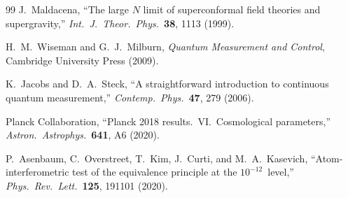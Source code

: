 \documentclass[12pt,letterpaper]{article}
\theoremstyle{definition}
\theoremstyle{remark}
\begin{document}
\begin{thebibliography}{99}
J.~Maldacena,
``The large $N$ limit of superconformal field theories and supergravity,''
\textit{Int.\ J.\ Theor.\ Phys.}\ \textbf{38}, 1113 (1999).

H.~M.~Wiseman and G.~J.~Milburn,
\textit{Quantum Measurement and Control},
Cambridge University Press (2009).

K.~Jacobs and D.~A.~Steck,
``A straightforward introduction to continuous quantum measurement,''
\textit{Contemp.\ Phys.}\ \textbf{47}, 279 (2006).

Planck Collaboration,
``Planck 2018 results.\ VI.\ Cosmological parameters,''
\textit{Astron.\ Astrophys.}\ \textbf{641}, A6 (2020).

P.~Asenbaum, C.~Overstreet, T.~Kim, J.~Curti, and M.~A.~Kasevich,
``Atom-interferometric test of the equivalence principle at the $10^{-12}$~level,''
\textit{Phys.\ Rev.\ Lett.}\ \textbf{125}, 191101 (2020).

\end{thebibliography}
\end{document}
